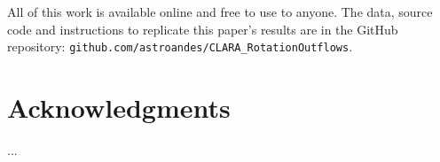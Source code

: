 \documentclass[twocolappendix]{latex/emulateapj}
\begin{document}
All of this work is available online and free to use to anyone. The data, source code and instructions to replicate this paper's results are in the GitHub repository:  \texttt{github.com/astroandes/CLARA\_RotationOutflows}. \\


\section*{Acknowledgments}

...\\







\newpage

\appendix
\end{document}

